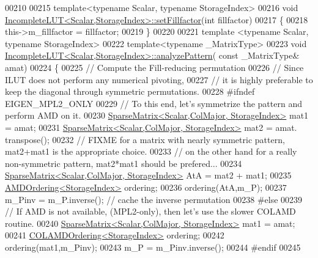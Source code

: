 \begin{DoxyCode}
00210 
00215 \textcolor{keyword}{template}<\textcolor{keyword}{typename} Scalar, \textcolor{keyword}{typename} StorageIndex>
00216 \textcolor{keywordtype}{void} \hyperlink{group___iterative_linear_solvers___module_a327767d12b55ff8a023f12a030051e17}{IncompleteLUT<Scalar,StorageIndex>::setFillfactor}(\textcolor{keywordtype}{int}
       fillfactor)
00217 \{
00218   this->m\_fillfactor = fillfactor;   
00219 \}
00220 
00221 \textcolor{keyword}{template} <\textcolor{keyword}{typename} Scalar, \textcolor{keyword}{typename} StorageIndex>
00222 \textcolor{keyword}{template}<\textcolor{keyword}{typename} \_MatrixType>
00223 \textcolor{keywordtype}{void} \hyperlink{group___iterative_linear_solvers___module_class_eigen_1_1_incomplete_l_u_t}{IncompleteLUT<Scalar,StorageIndex>::analyzePattern}(\textcolor{keyword}{
      const} \_MatrixType& amat)
00224 \{
00225   \textcolor{comment}{// Compute the Fill-reducing permutation}
00226   \textcolor{comment}{// Since ILUT does not perform any numerical pivoting,}
00227   \textcolor{comment}{// it is highly preferable to keep the diagonal through symmetric permutations.}
00228 \textcolor{preprocessor}{#ifndef EIGEN\_MPL2\_ONLY}
00229   \textcolor{comment}{// To this end, let's symmetrize the pattern and perform AMD on it.}
00230   \hyperlink{group___sparse_core___module}{SparseMatrix<Scalar,ColMajor, StorageIndex>} mat1 = amat;
00231   \hyperlink{group___sparse_core___module}{SparseMatrix<Scalar,ColMajor, StorageIndex>} mat2 = amat.
      transpose();
00232   \textcolor{comment}{// FIXME for a matrix with nearly symmetric pattern, mat2+mat1 is the appropriate choice.}
00233   \textcolor{comment}{//       on the other hand for a really non-symmetric pattern, mat2*mat1 should be prefered...}
00234   \hyperlink{group___sparse_core___module}{SparseMatrix<Scalar,ColMajor, StorageIndex>} AtA = mat2 + mat1;
00235   \hyperlink{group___ordering_methods___module_class_eigen_1_1_a_m_d_ordering}{AMDOrdering<StorageIndex>} ordering;
00236   ordering(AtA,m\_P);
00237   m\_Pinv  = m\_P.inverse(); \textcolor{comment}{// cache the inverse permutation}
00238 \textcolor{preprocessor}{#else}
00239   \textcolor{comment}{// If AMD is not available, (MPL2-only), then let's use the slower COLAMD routine.}
00240   \hyperlink{group___sparse_core___module}{SparseMatrix<Scalar,ColMajor, StorageIndex>} mat1 = amat;
00241   \hyperlink{group___ordering_methods___module_class_eigen_1_1_c_o_l_a_m_d_ordering}{COLAMDOrdering<StorageIndex>} ordering;
00242   ordering(mat1,m\_Pinv);
00243   m\_P = m\_Pinv.inverse();
00244 \textcolor{preprocessor}{#endif}
00245 

\end{DoxyCode}
